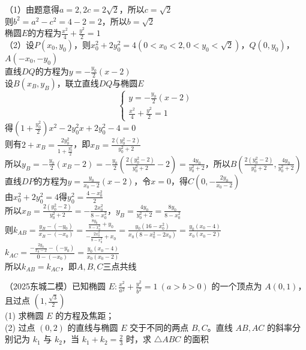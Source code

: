 \begin{solution}
（1）由题意得$a = 2, 2c = 2\sqrt{2}$，所以$c = \sqrt{2}$\\
则$b^2 = a^2 - c^2 = 4 - 2 = 2$，所以$b = \sqrt{2}$\\
椭圆$E$的方程为$\frac{x^2}{4}+\frac{y^2}{2}=1$\\
（2）设$P(x_0, y_0)$，则$x_0^2 + 2y_0^2 = 4(0 < x_0 < 2, 0 < y_0 < \sqrt{2})$，$Q(0, y_0)$，$A(-x_0, -y_0)$\\
直线$DQ$的方程为$y = -\frac{y_0}{2}(x - 2)$\\
设$B(x_B, y_B)$，联立直线$DQ$与椭圆$E$
\[
\begin{cases}
y = -\frac{y_0}{2}(x - 2) \\
\frac{x^2}{4} + \frac{y^2}{2} = 1
\end{cases}
\]
得$\left(1 + \frac{y_0^2}{2}\right)x^2 - 2y_0^2x + 2y_0^2 - 4 = 0$\\
则有$2 + x_B = \frac{2y_0^2}{1 + \frac{y_0^2}{2}}$，即$x_B = \frac{2(y_0^2 - 2)}{y_0^2 + 2}$\\
所以$y_B = -\frac{y_0}{2}(x_B - 2) = -\frac{y_0}{2}\left(\frac{2(y_0^2 - 2)}{y_0^2 + 2} - 2\right) = \frac{4y_0}{y_0^2 + 2}$，所以$B\left(\frac{2(y_0^2 - 2)}{y_0^2 + 2}, \frac{4y_0}{y_0^2 + 2}\right)$\\
直线$DP$的方程为$y = \frac{y_0}{x_0 - 2}(x - 2)$，令$x = 0$，得$C\left(0, -\frac{2y_0}{x_0 - 2}\right)$ \\
由$x_0^2 + 2y_0^2 = 4$得$y_0^2 = \frac{4 - x_0^2}{2}$\\
所以$x_B = \frac{2(y_0^2 - 2)}{y_0^2 + 2} = -\frac{2x_0^2}{8 - x_0^2}$，$y_B = \frac{4y_0}{y_0^2 + 2} = \frac{8y_0}{8 - x_0^2}$\\
则$k_{AB} = \frac{y_B - (-y_0)}{x_B - (-x_0)} = \frac{\frac{8y_0}{8 - x_0^2}+y_0}{-\frac{2x_0^2}{8 - x_0^2}+x_0} = \frac{y_0(16 - x_0^2)}{x_0(8 - x_0^2 - 2x_0)} = \frac{y_0(x_0 - 4)}{x_0(x_0 - 2)}$\\
$k_{AC} = \frac{-\frac{2y_0}{x_0 - 2} - (-y_0)}{0 - (-x_0)} = \frac{y_0(x_0 - 4)}{x_0(x_0 - 2)}$\\
所以$k_{AB} = k_{AC}$，即$A, B, C$三点共线

\end{solution}



\begin{example}
（2025东城二模）已知椭圆 $E:\frac{x^2}{a^2}+\frac{y^2}{b^2}=1\ (a>b>0)$ 的一个顶点为 $A(0,1)$，且过点 $\left(1,\frac{\sqrt{3}}{2}\right)$\\
(1) 求椭圆 $E$ 的方程及焦距；\\
(2) 过点 $\left(0,2\right)$ 的直线与椭圆 $E$ 交于不同的两点 $B,C$。直线 $AB,AC$ 的斜率分别记为 $k_1$ 与 $k_2$，当 $k_1+k_2=\frac{2}{3}$ 时，求 $\triangle ABC$ 的面积
\end{example}


